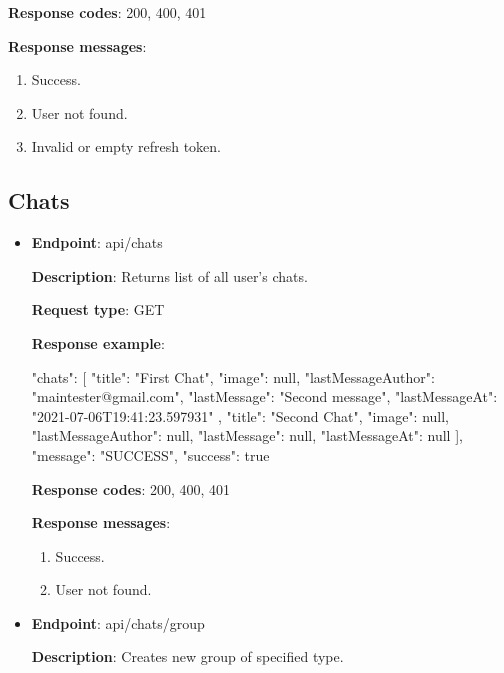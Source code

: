 \begin{itemize}
    \textbf{Response codes}: 200, 400, 401

    \textbf{Response messages}:
    \begin{enumerate}
        \item Success.
        \item User not found.
        \item Invalid or empty refresh token.
    \end{enumerate}

\end{itemize}

\subsection{Chats}\label{subsec:chats}
\begin{itemize}
    \item \textbf{Endpoint}: api/chats

    \textbf{Description}: Returns list of all user's chats.

    \textbf{Request type}: GET

    \textbf{Response example}:

    \begin{spverbatim}
    {
        "chats": [
            {
            "title": "First Chat",
            "image": null,
            "lastMessageAuthor": "maintester@gmail.com",
            "lastMessage": "Second message",
            "lastMessageAt": "2021-07-06T19:41:23.597931"
        },
            {
            "title": "Second Chat",
            "image": null,
            "lastMessageAuthor": null,
            "lastMessage": null,
            "lastMessageAt": null
        }
        ],
        "message": "SUCCESS",
        "success": true
    }
    \end{spverbatim}

    \textbf{Response codes}: 200, 400, 401

    \textbf{Response messages}:
    \begin{enumerate}
        \item Success.
        \item User not found.
    \end{enumerate}

    \item \textbf{Endpoint}: api/chats/group

    \textbf{Description}: Creates new group of specified type.


\end{itemize}

